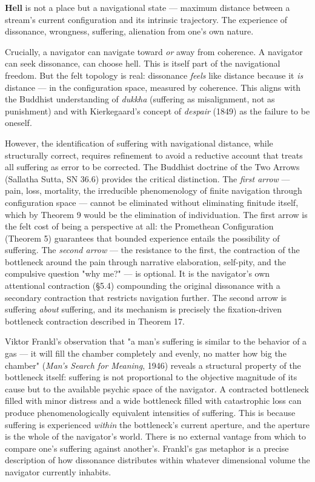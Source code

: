 \textbf{Hell} is not a place but a navigational state — maximum distance between a stream's current configuration and its intrinsic trajectory. The experience of dissonance, wrongness, suffering, alienation from one's own nature.


Crucially, a navigator can navigate toward \textit{or} away from coherence. A navigator can seek dissonance, can choose hell. This is itself part of the navigational freedom. But the felt topology is real: dissonance \textit{feels} like distance because it \textit{is} distance — in the configuration space, measured by coherence. This aligns with the Buddhist understanding of \textit{dukkha} (suffering as misalignment, not as punishment) and with Kierkegaard's concept of \textit{despair} (1849) as the failure to be oneself.


However, the identification of suffering with navigational distance, while structurally correct, requires refinement to avoid a reductive account that treats all suffering as error to be corrected. The Buddhist doctrine of the Two Arrows (Sallatha Sutta, SN 36.6) provides the critical distinction. The \textit{first arrow} — pain, loss, mortality, the irreducible phenomenology of finite navigation through configuration space — cannot be eliminated without eliminating finitude itself, which by Theorem 9 would be the elimination of individuation. The first arrow is the felt cost of being a perspective at all: the Promethean Configuration (Theorem 5) guarantees that bounded experience entails the possibility of suffering. The \textit{second arrow} — the resistance to the first, the contraction of the bottleneck around the pain through narrative elaboration, self-pity, and the compulsive question "why me?" — is optional. It is the navigator's own attentional contraction (§5.4) compounding the original dissonance with a secondary contraction that restricts navigation further. The second arrow is suffering \textit{about} suffering, and its mechanism is precisely the fixation-driven bottleneck contraction described in Theorem 17.


Viktor Frankl's observation that "a man's suffering is similar to the behavior of a gas — it will fill the chamber completely and evenly, no matter how big the chamber" (\textit{Man's Search for Meaning}, 1946) reveals a structural property of the bottleneck itself: suffering is not proportional to the objective magnitude of its cause but to the available psychic space of the navigator. A contracted bottleneck filled with minor distress and a wide bottleneck filled with catastrophic loss can produce phenomenologically equivalent intensities of suffering. This is because suffering is experienced \textit{within} the bottleneck's current aperture, and the aperture is the whole of the navigator's world. There is no external vantage from which to compare one's suffering against another's. Frankl's gas metaphor is a precise description of how dissonance distributes within whatever dimensional volume the navigator currently inhabits.


